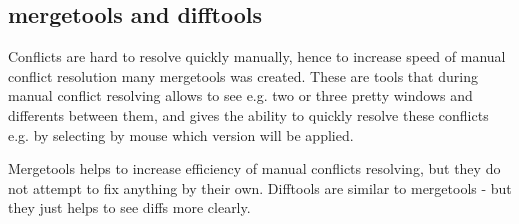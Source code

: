 \documentclass[a4paper,10pt]{article}
\begin{document}
\subsection*{mergetools and difftools}
Conflicts are hard to resolve quickly manually, hence to increase speed of manual conflict resolution
many mergetools was created. These are tools that during manual conflict resolving allows to see e.g. two or three pretty windows
and differents between them, and gives the ability to quickly resolve these conflicts e.g.
by selecting by mouse which version will be applied.

Mergetools helps to increase efficiency of manual conflicts resolving, but they do not attempt
to fix anything by their own. Difftools are similar to mergetools - but they just helps to see
diffs more clearly.
\end{document}
